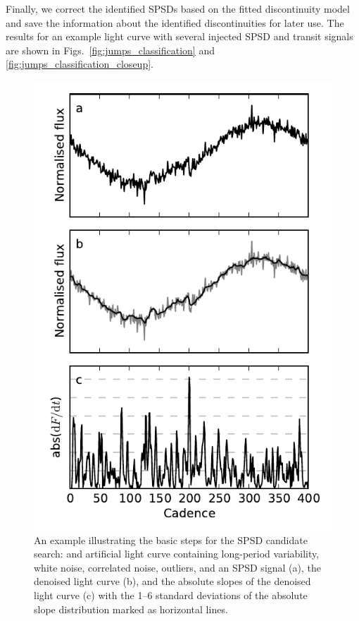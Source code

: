 \documentclass[useAMS,usenatbib]{mn2e}
\begin{document}
Finally, we correct the identified SPSDs based on the fitted discontinuity model and
save the information about the identified discontinuities for later use. The results
for an example light curve with several injected SPSD and transit signals are shown 
in Figs.~\ref{fig:jumps_classification} and \ref{fig:jumps_classification_closeup}.

\begin{figure}
 \centering
 \includegraphics[width=\columnwidth]{jumps_identification.pdf}
 \caption{An example illustrating the basic steps for the SPSD candidate search: 
  and artificial light curve containing long-period variability, white noise,
  correlated noise, outliers, and an SPSD signal (a),
  the denoised light curve (b), and the absolute slopes of the denoised light
  curve (c) with the 1--6 standard deviations of the absolute slope distribution 
  marked as horizontal lines.}
 \label{fig:jumps_identification}
\end{figure}
\end{document}
